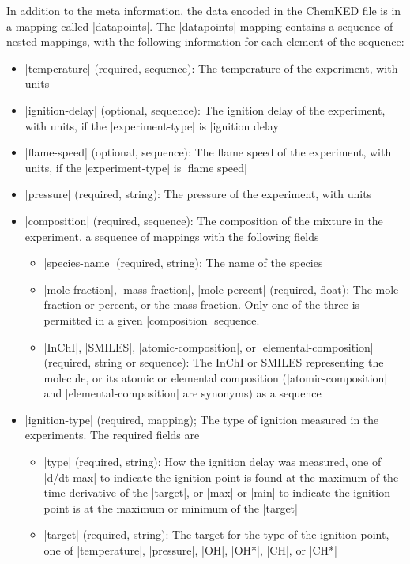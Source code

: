 \documentclass[12pt]{ussci}
\newcommand\ck{ChemKED}
\begin{document}
In addition to the meta information, the data encoded in the \ck{} file is in
a mapping called \yaml|datapoints|. The \yaml|datapoints| mapping contains a
sequence of nested mappings, with the following information for each element of
the sequence:
%
\begin{itemize}
    \item \yaml|temperature| (required, sequence): The temperature of the
    experiment, with units
    \item \yaml|ignition-delay| (optional, sequence): The ignition delay of the
    experiment, with units, if the \yaml|experiment-type| is \yaml|ignition
    delay|
    \item \yaml|flame-speed| (optional, sequence): The flame speed of the
    experiment, with units, if the \yaml|experiment-type| is \yaml|flame speed|
    \item \yaml|pressure| (required, string): The pressure of the experiment,
    with units
    \item \yaml|composition| (required, sequence): The composition of the
    mixture in the experiment, a sequence of mappings with the following fields
    \begin{itemize}
        \item \yaml|species-name| (required, string): The name of the species
        \item \yaml|mole-fraction|, \yaml|mass-fraction|, \yaml|mole-percent|
        (required, float): The mole fraction or percent, or the mass fraction.
        Only one of the three is permitted in a given \yaml|composition|
        sequence.
        \item \yaml|InChI|, \yaml|SMILES|, \yaml|atomic-composition|, or
        \yaml|elemental-composition| (required, string or sequence): The InChI
        or SMILES representing the molecule, or its atomic or elemental
        composition (\yaml|atomic-composition| and \yaml|elemental-composition|
        are synonyms) as a sequence
    \end{itemize}
    \item \yaml|ignition-type| (required, mapping); The type of ignition
    measured in the experiments. The required fields are
    \begin{itemize}
        \item \yaml|type| (required, string): How the ignition delay was
        measured, one of \yaml|d/dt max| to indicate the ignition point is
        found at the maximum of the time derivative of the \yaml|target|, or
        \yaml|max| or \yaml|min| to indicate the ignition point is at the
        maximum or minimum of the \yaml|target|
        \item \yaml|target| (required, string): The target for the type of the
        ignition point, one of \yaml|temperature|, \yaml|pressure|, \yaml|OH|,
        \yaml|OH*|, \yaml|CH|, or \yaml|CH*|
    \end{itemize}
\end{itemize}
\end{document}
